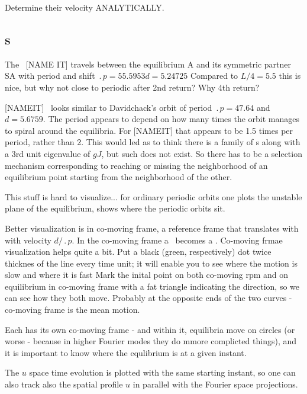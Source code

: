 Determine their velocity ANALYTICALLY.

\subsection{\Rpo s}


The \rpo\ [NAME IT] travels between the equilibrium A and its symmetric partner SA 
with period and shift
$\period{p}=55.5953 d=5.24725$
Compared to $L/4 = 5.5$
this is nice, but why not close to periodic after 2nd return? Why 4th return?

[NAMEIT] \rpo\ looks similar to Davidchack's  orbit
of period 
$\period{p}=47.64$ and $d=5.6759$. The period appears to depend on how
many times the orbit manages to spiral around the equilibria.
For [NAMEIT] that appears to be
1.5 times per period, rather than 2. This would led as
to
think there is a family of \rpo s along with a 3rd unit eigenvalue of
$gJ$,
but such does not exist.
So there has to be a selection mechanism corresponding to
reaching or missing the neighborhood of an equilibrium point starting from
the neighborhood of the other. 

This stuff is hard to visualize... for ordinary periodic orbits one
plots the unstable plane of the equilibrium, shows where the periodic
orbits sit.

Better visualization is in co-moving frame, {\ie} 
a reference frame that translates with with velocity $d/\period{p}$.
In the co-moving frame a \rpo\ becomes
a \po.
Co-moving frmae visualization helps quite a bit. Put a black (green, respectively) dot
twice thicknes of the line every time unit; it will enable you to see
where the motion is slow and where it is fast
Mark the inital point on both
co-moving rpm and on equilibrium in co-moving frame with a fat triangle
indicating the direction, so we can see how they both move. Probably at the
opposite ends of the two curves - co-moving frame is the mean motion.

Each {\rpo} has its own co-moving frame - and within it, equilibria
move on circles (or worse - because in higher Fourier modes they do mmore
complicted things), and it is important to know where the equlibrium is at
a given instant.

The $u$ space time evolution  %
is plotted with the same starting instant,
so one can also track also the spatial profile $u$ in parallel with
the Fourier space projections.

